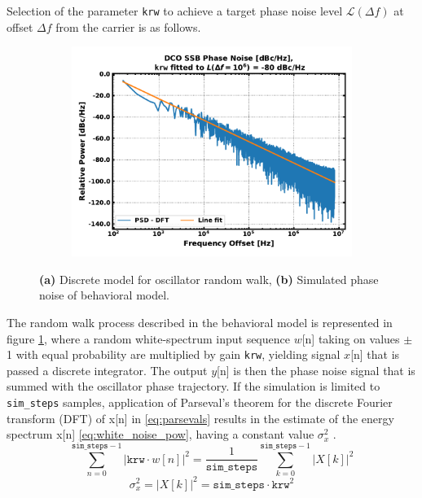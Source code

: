 Selection of the parameter \texttt{krw} to achieve a target phase noise level $\mathcal{L}(\Delta f)$ at offset $\Delta f$ from the carrier is as follows.
	\begin{figure}[htb!]
	    \centering
	    \begin{subfigure}{0.45\textwidth}
	        \centering
			
			\caption{ }
			\label{fig:rw_pn}
	    \end{subfigure}
	    \begin{subfigure}{0.5\textwidth}
	        \centering\includegraphics[width=1.0\textwidth, angle=0]{figs/dco_rw_pn.pdf}
			\caption{ }
			\label{fig:dco_rw_pn_sim}
	    \end{subfigure}%
	    \label{fig:dco_rw_model}
	    \caption{\textbf{(a)} Discrete model for oscillator random walk, \textbf{(b)} Simulated phase noise of behavioral model.}
	\end{figure}
	\FloatBarrier
The random walk process described in the behavioral model is represented in figure \ref{fig:rw_pn}, where a random white-spectrum input sequence $w$[n] taking on values $\pm$ 1 with equal probability are multiplied by gain \texttt{krw}, yielding signal $x$[n] that is passed a discrete integrator. The output $y$[n] is then the phase noise signal that is summed with the oscillator phase trajectory. If the simulation is limited to \texttt{sim\_steps} samples, application of Parseval's theorem for the discrete Fourier transform (DFT) of x[n] in \ref{eq:parsevals} results in the estimate of the energy spectrum x[n] \ref{eq:white_noise_pow}, having a constant value $\sigma_x^2$ .
\begin{equation}\label{eq:parsevals}
\sum _{n=0}^{\mathtt{sim\_steps}-1}|\texttt{krw}\cdot w[n]|^{2}=\frac{1}{\mathtt{sim\_steps}}\sum _{k=0}^{\mathtt{sim\_steps}-1}| X[k]|^{2}
\end{equation}
\begin{equation}\label{eq:white_noise_pow}
\sigma_x^2 = |X[k]|^{2} =\mathtt{sim\_steps}\cdot\texttt{krw}^2
\end{equation}


